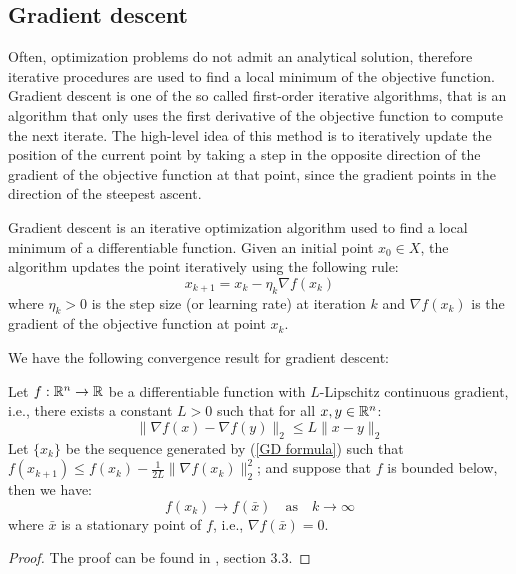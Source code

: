 \subsection{Gradient descent}\label{Gradient descent section}
Often, optimization problems do not admit an analytical solution, therefore iterative procedures are used to find a local minimum of the objective function.
Gradient descent is one of the so called first-order iterative algorithms, that is an algorithm that only uses the first derivative of the objective function to compute the next iterate.
The high-level idea of this method is to iteratively update the position of the current point by taking a step in the opposite direction of the gradient of the objective function at that point, since the gradient points in the direction of the steepest ascent.
\begin{definition}
    Gradient descent is an iterative optimization algorithm used to find a local minimum of a differentiable function. Given an initial point $x_0 \in X$, the algorithm updates the point iteratively using the following rule:
    \begin{equation}\label{GD formula}
        x_{k+1} = x_k - \eta_k \nabla f(x_k)
    \end{equation}
    where $\eta_k > 0$ is the step size (or learning rate) at iteration $k$ and $\nabla f(x_k)$ is the gradient of the objective function at point $x_k$.
\end{definition}
We have the following convergence result for gradient descent:
\begin{theorem}  \label{GD convergence theorem} 
    Let $f: \mathbb{R}^n \rightarrow \mathbb{R}$ be a differentiable function with $L$-Lipschitz continuous gradient, i.e., there exists a constant $L > 0$ such that for all $x, y \in \mathbb{R}^n$:
    \begin{equation*}
        \| \nabla f(x) - \nabla f(y) \|_2 \leq L \| x - y \|_2
    \end{equation*}
    Let $\{x_k\}$ be the sequence generated by (\ref{GD formula}) such that $f(x_{k+1}) \leq f(x_k) - \frac{1}{2L} \| \nabla f(x_k) \|_2^2$; and suppose that $f$ is bounded below, then we have:
    \begin{equation*}
        f(x_k) \rightarrow f(\bar{x}) \quad \text{as} \quad k \rightarrow \infty
    \end{equation*}
    where $\bar{x}$ is a stationary point of $f$, i.e., $\nabla f(\bar{x}) = 0$.
\end{theorem}
\begin{proof}
    The proof can be found in \cite{wright2022optimization}, section 3.3.
\end{proof}
